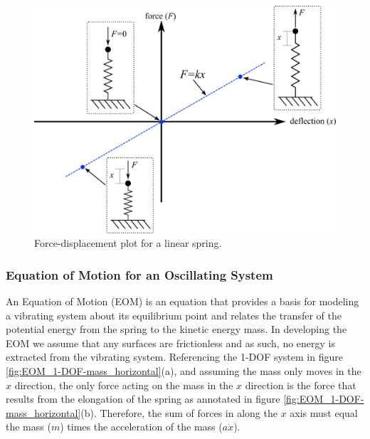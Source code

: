 \documentclass[12pt,letter]{article}
\begin{document}
			\begin{figure}[H]
				\centering
				\includegraphics[]{../figures/linear_spring_deformation.png}
				\caption{Force-displacement plot for a linear spring.}
				\label{fig:linear_spring_deformation}
			\end{figure}					






					
	\subsubsection{Equation of Motion for an Oscillating System}			
			
        An Equation of Motion (EOM) is an equation that provides a basis for modeling a vibrating system about its equilibrium point and relates the transfer of the potential energy from the spring to the kinetic energy mass. In developing the EOM we assume that any surfaces are frictionless and as such, no energy is extracted from the vibrating system. Referencing the 1-DOF system in figure \ref{fig:EOM_1-DOF-mass_horizontal}(a), and assuming the mass only moves in the $x$ direction, the only force acting on the mass in the $x$ direction is the force that results from the elongation of the spring as annotated in figure \ref{fig:EOM_1-DOF-mass_horizontal}(b). Therefore, the sum of forces in along the $x$ axis must equal the mass ($m$) times the acceleration of the mass ($a\dot{x}$). 
\end{document}
